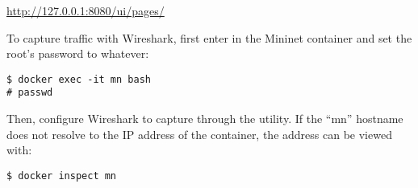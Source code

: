 \begin{center}
	\url{http://127.0.0.1:8080/ui/pages/}
\end{center}

To capture traffic with Wireshark, first enter in the Mininet container and set
the root's password to whatever:
\begin{verbatim}
$ docker exec -it mn bash
# passwd
\end{verbatim}

Then, configure Wireshark to capture through the  utility. If the
``mn'' hostname does not resolve to the IP address of the container, the address
can be viewed with:
\begin{verbatim}
$ docker inspect mn
\end{verbatim}
